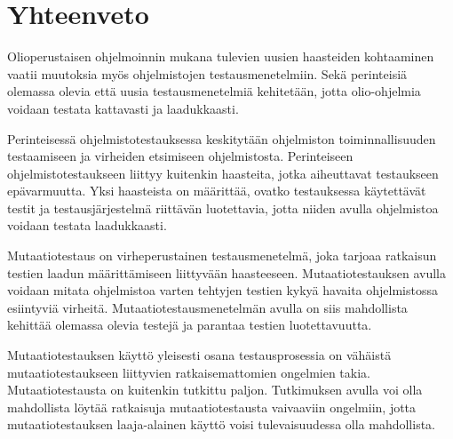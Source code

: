 \documentclass[finnish, grading]{tktltiki2}
\theoremstyle{definition}
\theoremstyle{remark}
\begin{document}
\section{Yhteenveto}

Olioperustaisen ohjelmoinnin mukana tulevien uusien haasteiden kohtaaminen vaatii muutoksia myös ohjelmistojen testausmenetelmiin. Sekä perinteisiä olemassa olevia että uusia testausmenetelmiä kehitetään, jotta olio-ohjelmia voidaan testata kattavasti ja laadukkaasti. 

Perinteisessä ohjelmistotestauksessa keskitytään ohjelmiston toiminnallisuuden testaamiseen ja virheiden etsimiseen ohjelmistosta. Perinteiseen ohjelmistotestaukseen liittyy kuitenkin haasteita, jotka aiheuttavat testaukseen epävarmuutta. Yksi haasteista on määrittää, ovatko testauksessa käytettävät testit ja testausjärjestelmä riittävän luotettavia, jotta niiden avulla ohjelmistoa voidaan testata laadukkaasti.

Mutaatiotestaus on virheperustainen testausmenetelmä, joka tarjoaa ratkaisun testien laadun määrittämiseen liittyvään haasteeseen. Mutaatiotestauksen avulla voidaan mitata ohjelmistoa varten tehtyjen testien kykyä havaita ohjelmistossa esiintyviä virheitä. Mutaatiotestausmenetelmän avulla on siis mahdollista kehittää olemassa olevia testejä ja parantaa testien luotettavuutta.

Mutaatiotestauksen käyttö yleisesti osana testausprosessia on vähäistä mutaatiotestaukseen liittyvien ratkaisemattomien ongelmien takia. Mutaatiotestausta on kuitenkin tutkittu paljon. Tutkimuksen avulla voi olla mahdollista löytää ratkaisuja mutaatiotestausta vaivaaviin ongelmiin, jotta mutaatiotestauksen laaja-alainen käyttö voisi tulevaisuudessa olla mahdollista.


\end{document}

